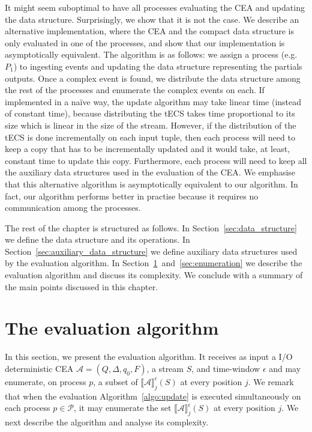 It might seem suboptimal to have all processes evaluating the CEA and updating the data structure. Surprisingly, we show that it is not the case. We describe an alternative implementation, where the CEA and the compact data structure is only evaluated in one of the processes, and show that our implementation is asymptotically equivalent. The algorithm is as follows: we assign a process (e.g. $P_{1}$) to ingesting events and updating the data structure representing the partials outputs. Once a complex event is found, we distribute the data structure among the rest of the processes and enumerate the complex events on each. If implemented in a na\"ive way, the update algorithm may take linear time (instead of constant time), because distributing the tECS takes time proportional to its size which is linear in the size of the stream. However, if the distribution of the tECS is done incrementally on each input tuple, then each process will need to keep a copy that has to be incrementally updated and it would take, at least, constant time to update this copy. Furthermore, each process will need to keep all the auxiliary data structures used in the evaluation of the CEA. We emphasise that this alternative algorithm is asymptotically equivalent to our  algorithm. In fact, our algorithm performs better in practise because it requires no communication among the processes.

The rest of the chapter is structured as follows. In Section~\ref{sec:data_structure} we define the data structure and its operations. In Section~\ref{sec:auxiliary_data_structure} we define auxiliary data structures used by the evaluation algorithm. In Section~\ref{sec:evaluation}~and~\ref{sec:enumeration} we describe the evaluation algorithm and discuss its complexity. We conclude with a summary of the main points discussed in this chapter.

\section{The evaluation algorithm}\label{sec:evaluation}

In this section, we present the evaluation algorithm. It receives as input a I/O deterministic CEA ${\mathcal{A} = (Q, \Delta, q_{0}, F)}$, a stream $S$, and time-window $\epsilon$ and may enumerate, on process $p$, a subset of ${\llbracket \mathcal{A} \rrbracket}^{\epsilon}_{j}(S)$ at every position $j$. We remark that when the evaluation Algorithm~\ref{algo:update} is executed simultaneously on each process $p \in \mathcal{P}$, it may enumerate the set ${\llbracket \mathcal{A} \rrbracket}^{\epsilon}_{j}(S)$ at every position $j$. We next describe the algorithm and analyse its complexity.

